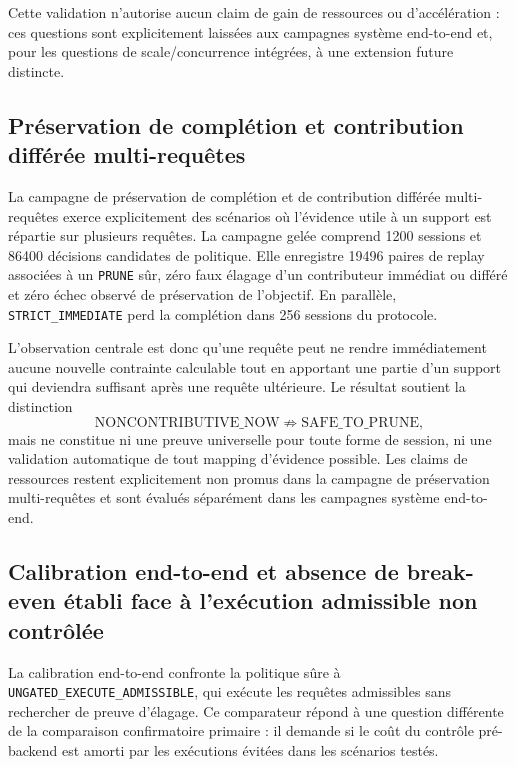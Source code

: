 \documentclass[journal]{IEEEtran}
\begin{document}


Cette validation n'autorise aucun claim de gain de ressources ou d'accélération : ces questions sont explicitement laissées aux campagnes système end-to-end et, pour les questions de scale/concurrence intégrées, à une extension future distincte.

\subsection{Préservation de complétion et contribution différée multi-requêtes}

La campagne de préservation de complétion et de contribution différée multi-requêtes exerce explicitement des scénarios où l'évidence utile à un support est répartie sur plusieurs requêtes. La campagne gelée comprend 1200 sessions et 86400 décisions candidates de politique. Elle enregistre 19496 paires de replay associées à un \texttt{PRUNE} sûr, zéro faux élagage d'un contributeur immédiat ou différé et zéro échec observé de préservation de l'objectif. En parallèle, \texttt{STRICT\_IMMEDIATE} perd la complétion dans 256 sessions du protocole.



L'observation centrale est donc qu'une requête peut ne rendre immédiatement aucune nouvelle contrainte calculable tout en apportant une partie d'un support qui deviendra suffisant après une requête ultérieure. Le résultat soutient la distinction
\[
\text{NONCONTRIBUTIVE\_NOW}\not\Rightarrow\text{SAFE\_TO\_PRUNE},
\]
mais ne constitue ni une preuve universelle pour toute forme de session, ni une validation automatique de tout mapping d'évidence possible. Les claims de ressources restent explicitement non promus dans la campagne de préservation multi-requêtes et sont évalués séparément dans les campagnes système end-to-end.

\subsection{Calibration end-to-end et absence de break-even établi face à l'exécution admissible non contrôlée}

La calibration end-to-end confronte la politique sûre à \texttt{UNGATED\_EXECUTE\_ADMISSIBLE}, qui exécute les requêtes admissibles sans rechercher de preuve d'élagage. Ce comparateur répond à une question différente de la comparaison confirmatoire primaire : il demande si le coût du contrôle pré-backend est amorti par les exécutions évitées dans les scénarios testés.
\end{document}
